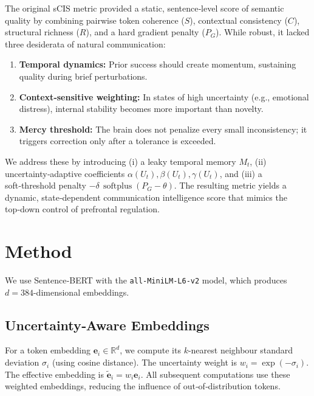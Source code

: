 \documentclass[11pt]{article}
\DeclareMathOperator{\softplus}{softplus}
\theoremstyle{definition}
\begin{document}
The original sCIS metric \cite{sCISv1} provided a static, sentence‑level score of semantic quality by combining pairwise token coherence (\(S\)), contextual consistency (\(C\)), structural richness (\(R\)), and a hard gradient penalty (\(P_G\)). While robust, it lacked three desiderata of natural communication:

\begin{enumerate}[nosep,leftmargin=*]
    \item \textbf{Temporal dynamics:} Prior success should create momentum, sustaining quality during brief perturbations.
    \item \textbf{Context‑sensitive weighting:} In states of high uncertainty (e.g., emotional distress), internal stability becomes more important than novelty.
    \item \textbf{Mercy threshold:} The brain does not penalize every small inconsistency; it triggers correction only after a tolerance is exceeded.
\end{enumerate}

We address these by introducing (i) a leaky temporal memory \(M_t\), (ii) uncertainty‑adaptive coefficients \(\alpha(U_t),\beta(U_t),\gamma(U_t)\), and (iii) a soft‑threshold penalty \(-\delta\,\softplus(P_G - \theta)\). The resulting metric yields a dynamic, state‑dependent communication intelligence score that mimics the top‑down control of prefrontal regulation.

\section{Method}

We use Sentence‑BERT \cite{reimers2019sentence} with the \texttt{all-MiniLM-L6-v2} model, which produces \(d=384\)-dimensional embeddings.

\subsection{Uncertainty‑Aware Embeddings}
For a token embedding \(\mathbf{e}_i \in \mathbb{R}^d\), we compute its \(k\)-nearest neighbour standard deviation \(\sigma_i\) (using cosine distance). The uncertainty weight is \(w_i = \exp(-\sigma_i)\). The effective embedding is \(\tilde{\mathbf{e}}_i = w_i \mathbf{e}_i\). All subsequent computations use these weighted embeddings, reducing the influence of out‑of‑distribution tokens.
\end{document}
